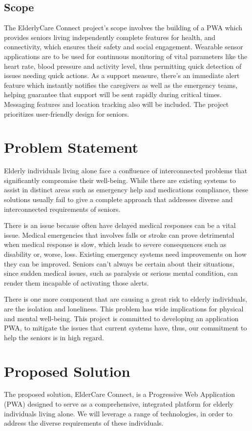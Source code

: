\documentclass{article}
\begin{document}
\subsection{Scope}

The ElderlyCare Connect project's scope involves the building of a PWA which provides seniors living independently complete features for health, and connectivity, which ensures their safety and social engagement. Wearable sensor applications are to be used for continuous monitoring of vital parameters like the heart rate, blood pressure and activity level, thus permitting quick detection of issues needing quick actions. As a support measure, there's an immediate alert feature which instantly notifies the caregivers as well as the emergency teams, helping guarantee that support will be sent rapidly during critical times. Messaging features and location tracking also will be included. The project prioritizes user-friendly design for seniors.

\section{Problem Statement}
Elderly individuals living alone face a confluence of interconnected problems that significantly compromise their well-being. While there are existing systems to assist in distinct areas such as emergency help and medications compliance, these solutions usually fail to give a complete approach that addresses diverse and interconnected requirements of seniors.

There is an issue because often have delayed medical responses can be a vital issue. Medical emergencies that involves falls or stroke can prove detrimental when medical response is slow, which leads to severe consequences such as disability or, worse, loss. Existing emergency systems need improvements on how they can be improved. Seniors can't always be certain about their situations, since sudden medical issues, such as paralysis or serious mental condition, can render them incapable of activating those alerts.

There is one more component that are causing a great risk to elderly individuals, are the isolation and loneliness. This problem has wide implications for physical and mental well-being.
This project is committed to developing an application PWA, to mitigate the issues that current systems have, thus, our commitment to help the seniors is in high regard.

\section{Proposed Solution}
The proposed solution, ElderCare Connect, is a Progressive Web Application (PWA) designed to serve as a comprehensive, integrated platform for elderly individuals living alone. We will leverage a range of technologies, in order to address the diverse requirements of these individuals.
\end{document}
